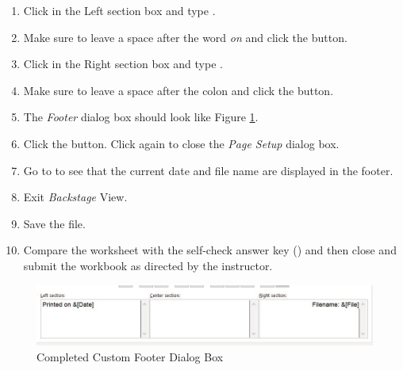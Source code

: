 \begin{enumbox}
	\begin{enumerate}
		\item Click in the Left section box and type .
		\item Make sure to leave a space after the word \textit{on} and click the  button.
		\item Click in the Right section box and type .
		\item Make sure to leave a space after the colon and click the  button.
		\item The \textit{Footer} dialog box should look like Figure \ref{02:fig46}.
		\item Click the  button. Click  again to close the \textit{Page Setup} dialog box.
		\item Go to  to see that the current date and file name are displayed in the footer.
		\item Exit \textit{Backstage} View.
		\item Save the  file.
		\item Compare the worksheet with the self-check answer key () and then close and submit the  workbook as directed by the instructor.	
	\end{enumerate}
\end{enumbox}

\begin{figure}[H]
	\centering
	\includegraphics[width=\maxwidth{.95\linewidth}]{gfx/ch02_fig46}
	\caption{Completed Custom Footer Dialog Box}
	\label{02:fig46}
\end{figure}

